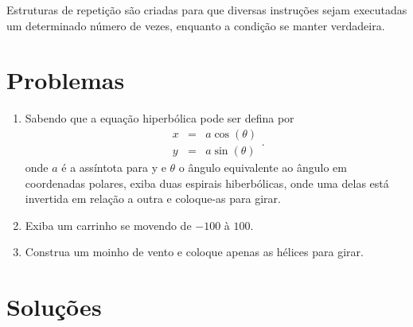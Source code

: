 Estruturas de repetição são criadas para que diversas instruções sejam executadas um determinado número de vezes, enquanto a condição se manter verdadeira.


%







\section*{Problemas}
\begin{enumerate}
\item
  Sabendo que a equação hiperbólica pode ser defina por
  $$
  \begin{matrix}
  x	& = &	a \cos(\theta) \\ 
  y	& = &	a \sin(\theta)
  \end{matrix}.
  $$
  onde $a$ é a assíntota para y e $\theta$ o ângulo equivalente ao ângulo em coordenadas polares, exiba duas espirais hiberbólicas, onde uma delas está invertida em relação a outra e coloque-as para girar.
  \label{ex:cap01_ex5}

\item
  Exiba um carrinho se movendo de $-100$ à $100$.
  \label{ex:cap01_ex6}

\item
  Construa um moinho de vento e coloque apenas as hélices para girar.
  \label{ex:cap01_ex7}
\end{enumerate}

\section*{Soluções}

